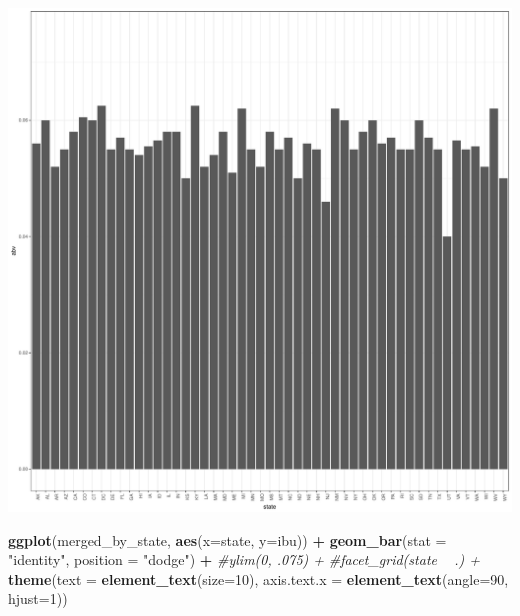 \documentclass[]{article}
\newenvironment{Shaded}{\begin{snugshade}}{\end{snugshade}}
\newcommand{\KeywordTok}[1]{\textcolor[rgb]{0.13,0.29,0.53}{\textbf{#1}}}
\newcommand{\DataTypeTok}[1]{\textcolor[rgb]{0.13,0.29,0.53}{#1}}
\newcommand{\DecValTok}[1]{\textcolor[rgb]{0.00,0.00,0.81}{#1}}
\newcommand{\StringTok}[1]{\textcolor[rgb]{0.31,0.60,0.02}{#1}}
\newcommand{\CommentTok}[1]{\textcolor[rgb]{0.56,0.35,0.01}{\textit{#1}}}
\newcommand{\OperatorTok}[1]{\textcolor[rgb]{0.81,0.36,0.00}{\textbf{#1}}}
\newcommand{\NormalTok}[1]{#1}
\begin{document}
\begin{center}\includegraphics{Analysis_Final_files/figure-latex/unnamed-chunk-17-1} \end{center}

\begin{Shaded}
\begin{Highlighting}[]
\KeywordTok{ggplot}\NormalTok{(merged_by_state, }\KeywordTok{aes}\NormalTok{(}\DataTypeTok{x=}\NormalTok{state, }\DataTypeTok{y=}\NormalTok{ibu)) }\OperatorTok{+}
\StringTok{  }\KeywordTok{geom_bar}\NormalTok{(}\DataTypeTok{stat =} \StringTok{"identity"}\NormalTok{, }\DataTypeTok{position =} \StringTok{"dodge"}\NormalTok{) }\OperatorTok{+}
\StringTok{  }\CommentTok{#ylim(0, .075) +}
\StringTok{  }\CommentTok{#facet_grid(state ~ .) +}
\StringTok{  }\KeywordTok{theme}\NormalTok{(}\DataTypeTok{text =} \KeywordTok{element_text}\NormalTok{(}\DataTypeTok{size=}\DecValTok{10}\NormalTok{),}
        \DataTypeTok{axis.text.x =} \KeywordTok{element_text}\NormalTok{(}\DataTypeTok{angle=}\DecValTok{90}\NormalTok{, }\DataTypeTok{hjust=}\DecValTok{1}\NormalTok{)) }
\end{Highlighting}
\end{Shaded}
\end{document}
